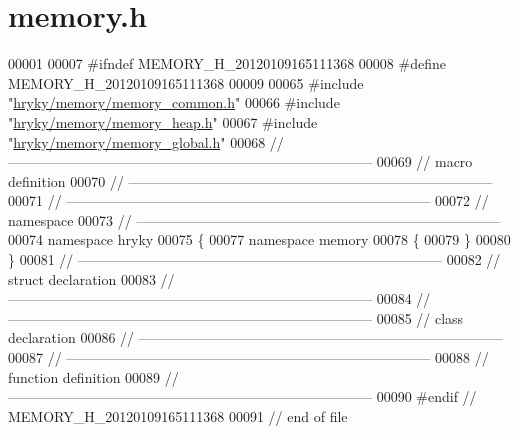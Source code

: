 \hypertarget{memory_8h_source}{\section{memory.\-h}
}

\begin{DoxyCode}
00001 
00007 \textcolor{preprocessor}{#ifndef MEMORY\_H\_20120109165111368}
00008 \textcolor{preprocessor}{}\textcolor{preprocessor}{#define MEMORY\_H\_20120109165111368}
00009 \textcolor{preprocessor}{}
00065 \textcolor{preprocessor}{#include "\hyperlink{memory__common_8h}{hryky/memory/memory_common.h}"}
00066 \textcolor{preprocessor}{#include "\hyperlink{memory__heap_8h}{hryky/memory/memory_heap.h}"}
00067 \textcolor{preprocessor}{#include "\hyperlink{memory__global_8h}{hryky/memory/memory_global.h}"}
00068 \textcolor{comment}{//
      ------------------------------------------------------------------------------}
00069 \textcolor{comment}{// macro definition}
00070 \textcolor{comment}{//
      ------------------------------------------------------------------------------}
00071 \textcolor{comment}{//
      ------------------------------------------------------------------------------}
00072 \textcolor{comment}{// namespace}
00073 \textcolor{comment}{//
      ------------------------------------------------------------------------------}
00074 \textcolor{keyword}{namespace }hryky
00075 \{
00077 \textcolor{keyword}{namespace }memory
00078 \{
00079 \}
00080 \}
00081 \textcolor{comment}{//
      ------------------------------------------------------------------------------}
00082 \textcolor{comment}{// struct declaration}
00083 \textcolor{comment}{//
      ------------------------------------------------------------------------------}
00084 \textcolor{comment}{//
      ------------------------------------------------------------------------------}
00085 \textcolor{comment}{// class declaration}
00086 \textcolor{comment}{//
      ------------------------------------------------------------------------------}
00087 \textcolor{comment}{//
      ------------------------------------------------------------------------------}
00088 \textcolor{comment}{// function definition}
00089 \textcolor{comment}{//
      ------------------------------------------------------------------------------}
00090 \textcolor{preprocessor}{#endif // MEMORY\_H\_20120109165111368}
00091 \textcolor{preprocessor}{}\textcolor{comment}{// end of file}
\end{DoxyCode}
